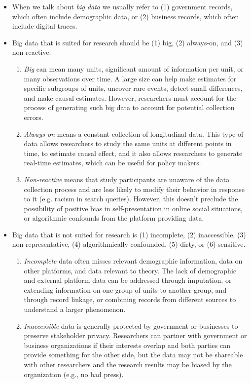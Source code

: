\documentclass[11pt,letterpaper]{article}
\begin{document}
\begin{itemize}
\item When we talk about \emph{big data} we usually refer to (1) government records, which often include demographic data, or (2) business records, which often include digital traces.
\item Big data that is suited for research should be (1) big, (2) always-on, and (3) non-reactive.
\begin{enumerate}
\item \emph{Big} can mean many units, significant amount of information per unit, or many observations over time. A large size can help make estimates for specific subgroups of units, uncover rare events, detect small differences, and make causal estimates. However, researchers must account for the process of generating such big data to account for potential collection errors.
\item \emph{Always-on} means a constant collection of longitudinal data. This type of data allows researchers to study the same units at different points in time, to estimate causal effect, and it also allows researchers to generate real-time estimates, which can be useful for policy makers.
\item \emph{Non-reactive} means that study participants are unaware of the data collection process and are less likely to modify their behavior in response to it (e.g. racism in search queries). However, this doesn't preclude the possibility of positive bias in self-presentation in online social situations, or algorithmic confounds from the platform providing data.
\end{enumerate}
\item Big data that is not suited for research is (1) incomplete, (2) inaccessible, (3) non-representative, (4) algorithmically confounded, (5) dirty, or (6) sensitive.
\begin{enumerate}
\item \emph{Incomplete} data often misses relevant demographic information, data on other platforms, and data relevant to theory. The lack of demographic and external platform data can be addressed through imputation, or extending information on one group of units to another group, and through record linkage, or combining records from different sources to understand a larger phenomenon.
\item \emph{Inaccessible} data is generally protected by government or businesses to preserve stakeholder privacy. Researchers can partner with government or business organizations if their interests overlap and both parties can provide something for the other side, but the data may not be shareable with other researchers and the research results may be biased by the organization (e.g., no bad press).

\end{enumerate}
\end{itemize}
\end{document}
